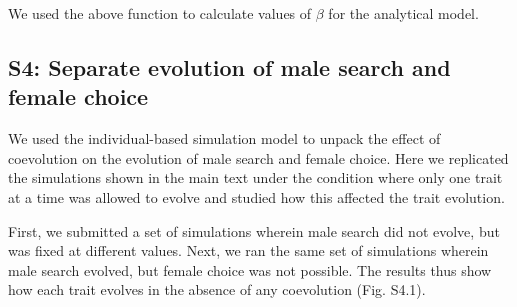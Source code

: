 \documentclass[
]{article}
\begin{document}
We used the above function to calculate values of \(\beta\) for the
analytical model.

\clearpage

\hypertarget{s4-separate-evolution-of-male-search-and-female-choice}{%
\subsection{S4: Separate evolution of male search and female
choice}\label{s4-separate-evolution-of-male-search-and-female-choice}}

We used the individual-based simulation model to unpack the effect of
coevolution on the evolution of male search and female choice. Here we
replicated the simulations shown in the main text under the condition
where only one trait at a time was allowed to evolve and studied how
this affected the trait evolution.

First, we submitted a set of simulations wherein male search did not
evolve, but was fixed at different values. Next, we ran the same set of
simulations wherein male search evolved, but female choice was not
possible. The results thus show how each trait evolves in the absence of
any coevolution (Fig. S4.1).

\captionsetup{labelformat=empty}
\end{document}
